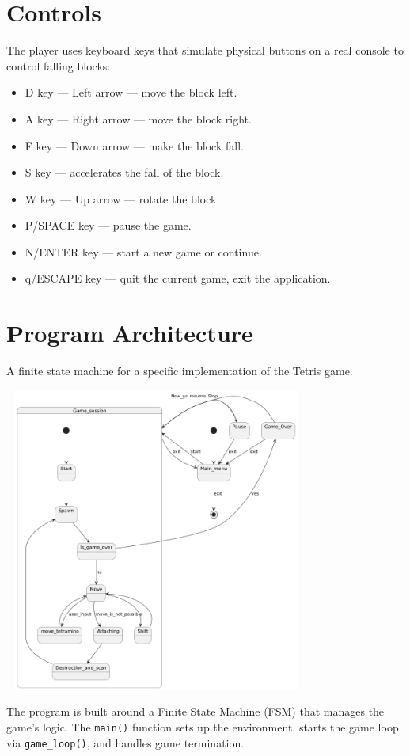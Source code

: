 \documentclass{article}
\begin{document}
\section{Controls}
The player uses keyboard keys that simulate physical buttons on a real console to control falling blocks:
\begin{itemize}
    \item D key — Left arrow — move the block left.
    \item A key — Right arrow — move the block right.
    \item F key — Down arrow — make the block fall.
    \item S key — accelerates the fall of the block.
    \item W key — Up arrow — rotate the block.
    \item P/SPACE key — pause the game.
    \item N/ENTER key — start a new game or continue.
    \item q/ESCAPE key — quit the current game, exit the application.
\end{itemize}

\section{Program Architecture}
A finite state machine for a specific implementation of the Tetris game.

\includegraphics[width=10cm, height=10cm]{images/FSM.png}

The program is built around a Finite State Machine (FSM) that manages the game’s logic. The \texttt{main()} function sets up the environment, starts the game loop via \texttt{game\_loop()}, and handles game termination.
\end{document}
